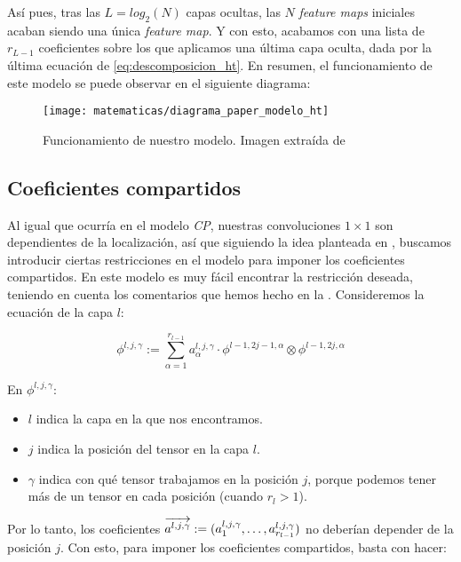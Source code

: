Así pues, tras las $L = log_2(N)$ capas ocultas, las $N$ \textit{feature maps} iniciales acaban siendo una única \textit{feature map}. Y con esto, acabamos con una lista de $r_{L - 1}$ coeficientes sobre los que aplicamos una última capa oculta, dada por la última ecuación de \eqref{eq:descomposicion_ht}. En resumen, el funcionamiento de este modelo se puede observar en el siguiente diagrama:

\begin{figure}[H]
	\centering
	\texttt{[image: matematicas/diagrama\_paper\_modelo\_ht]}
	\caption{Funcionamiento de nuestro modelo. Imagen extraída de \cite{matematicas:principal}}
\end{figure}

\subsection{Coeficientes compartidos}

Al igual que ocurría en el modelo \textit{CP}, nuestras convoluciones $1 \times 1$ son dependientes de la localización, así que siguiendo la idea planteada en , buscamos introducir ciertas restricciones en el modelo para imponer los coeficientes compartidos. En este modelo es muy fácil encontrar la restricción deseada, teniendo en cuenta los comentarios que hemos hecho en la . Consideremos la ecuación de la capa $l$:

\begin{equation}
	\phi^{l, j, \gamma} := \sum_{\alpha = 1}^{r_{l-1}} a_{\alpha}^{l, j, \gamma} \cdot \phi^{l-1, 2j-1, \alpha} \otimes \phi^{l-1, 2j, \alpha}
\end{equation}

En $\phi^{l, j, \gamma}$:

\begin{itemize}
	\item $l$ indica la capa en la que nos encontramos.
	\item $j$ indica la posición del tensor en la capa $l$.
	\item $\gamma$ indica con qué tensor trabajamos en la posición $j$, porque podemos tener más de un tensor en cada posición (cuando $r_l > 1$).
\end{itemize}

Por lo tanto, los coeficientes $\overrightarrow{a^{l, j, \gamma}} := (a^{l, j, \gamma}_1, \ldots, a^{l, j, \gamma}_{r_{l-1}})$ no deberían depender de la posición $j$. Con esto, para imponer los coeficientes compartidos, basta con hacer:

